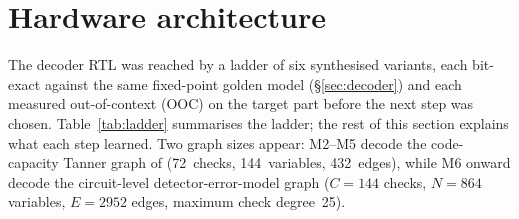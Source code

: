 \section{Hardware architecture}
\label{sec:architecture}

The decoder RTL was reached by a ladder of six synthesised variants, each
bit-exact against the same fixed-point golden model
(\S\ref{sec:decoder}) and each measured out-of-context (OOC) on the
target part before the next step was chosen. Table~\ref{tab:ladder}
summarises the ladder; the rest of this section explains what each step
learned. Two graph sizes appear: M2--M5 decode the code-capacity Tanner
graph of \gross{} (72~checks, 144~variables, 432~edges),
while M6 onward decode the circuit-level detector-error-model graph
($C=144$ checks, $N=864$ variables, $E=2952$ edges, maximum check degree~25).

